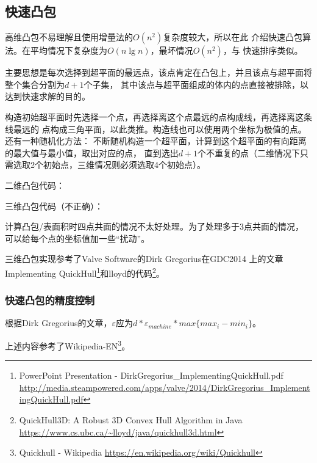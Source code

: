 \subsection{快速凸包}
高维凸包不易理解且使用增量法的$O(n^2)$复杂度较大，所以在此
介绍快速凸包算法。在平均情况下复杂度为$O(n\lg n)$，最坏情况$O(n^2)$，与
快速排序类似。

主要思想是每次选择到超平面的最远点，该点肯定在凸包上，并且该点与超平面将整个集合分割为$d+1$个子集，
其中该点与超平面组成的体内的点直接被排除，以达到快速求解的目的。

构造初始超平面时先选择一个点，再选择离这个点最远的点构成线，再选择离这条线最远的
点构成三角平面，以此类推。构造线也可以使用两个坐标为极值的点。还有一种随机化方法：
不断随机构造一个超平面，计算到这个超平面的有向距离的最大值与最小值，取出对应的点，
直到选出$d+1$个不重复的点（二维情况下只需选取2个初始点，三维情况则必须选取4个初始点）。

二维凸包代码：

三维凸包代码（不正确）：

计算凸包/表面积时四点共面的情况不太好处理。为了处理多于3点共面的情况，
可以给每个点的坐标值加一些``扰动''。


三维凸包实现参考了Valve Software的Dirk Gregorius在GDC2014
上的文章Implementing QuickHull\footnote{
	PowerPoint Presentation - DirkGregorius\_ImplementingQuickHull.pdf\\
	\url{http://media.steampowered.com/apps/valve/2014/DirkGregorius\_ImplementingQuickHull.pdf}
}和lloyd的代码\footnote{
	QuickHull3D: A Robust 3D Convex Hull Algorithm in Java\\
	\url{https://www.cs.ubc.ca/\~lloyd/java/quickhull3d.html}
}。

\subsubsection{快速凸包的精度控制}
根据Dirk Gregorius的文章，$\varepsilon$应为$d*\varepsilon_{machine}*max\{max_i-min_i\}$。

上述内容参考了Wikipedia-EN\footnote{
	Quickhull - Wikipedia
	\url{https://en.wikipedia.org/wiki/Quickhull}
}。
